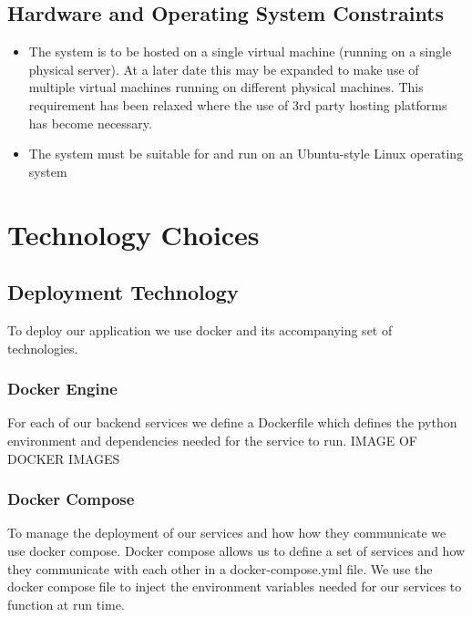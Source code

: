 \documentclass[12pt]{article}
\begin{document}
\subsection{Hardware and Operating System Constraints}
\begin{itemize}
    \item The system is to be hosted on a single virtual machine (running on a single physical server). At a later date this may be expanded to make use of multiple virtual machines running on different physical machines. This requirement has been relaxed where the use of 3rd party hosting platforms has become necessary.
    \item The system must be suitable for and run on an Ubuntu-style Linux operating system
\end{itemize}

\newpage

\section{Technology Choices}

\subsection{Deployment Technology}


To deploy our application we use docker and its accompanying set of technologies.
\subsubsection{Docker Engine}
    For each of our backend services we define a Dockerfile which defines the python environment and dependencies needed for the service to run.
    \newline IMAGE OF DOCKER IMAGES
\subsubsection{Docker Compose}
    To manage the deployment of our services and how how they communicate we use docker compose.
    \newline Docker compose allows us to define a set of services and how they communicate with each other in a docker-compose.yml file.
    \newline We use the docker compose file to inject the environment variables needed for our services to function at run time.
\end{document}
